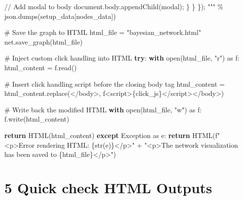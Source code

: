 \documentclass[
  11pt,
  letterpaper,
]{book}
\newenvironment{Shaded}{\begin{snugshade}}{\end{snugshade}}
\newcommand{\BuiltInTok}[1]{\textcolor[rgb]{0.00,0.23,0.31}{#1}}
\newcommand{\CommentTok}[1]{\textcolor[rgb]{0.37,0.37,0.37}{#1}}
\newcommand{\ControlFlowTok}[1]{\textcolor[rgb]{0.00,0.23,0.31}{\textbf{#1}}}
\newcommand{\ImportTok}[1]{\textcolor[rgb]{0.00,0.46,0.62}{#1}}
\newcommand{\NormalTok}[1]{\textcolor[rgb]{0.00,0.23,0.31}{#1}}
\newcommand{\OperatorTok}[1]{\textcolor[rgb]{0.37,0.37,0.37}{#1}}
\newcommand{\PreprocessorTok}[1]{\textcolor[rgb]{0.68,0.00,0.00}{#1}}
\newcommand{\SpecialCharTok}[1]{\textcolor[rgb]{0.37,0.37,0.37}{#1}}
\newcommand{\SpecialStringTok}[1]{\textcolor[rgb]{0.13,0.47,0.30}{#1}}
\newcommand{\StringTok}[1]{\textcolor[rgb]{0.13,0.47,0.30}{#1}}
\begin{document}
\begin{Shaded}
\begin{Highlighting}[]
\StringTok{                // Add modal to body}
\StringTok{                document.body.appendChild(modal);}
\StringTok{            \}}
\StringTok{        \}}
\StringTok{    \});}
\StringTok{    """} \OperatorTok{\%}\NormalTok{ json.dumps(setup\_data[}\StringTok{\textquotesingle{}nodes\_data\textquotesingle{}}\NormalTok{])}

    \CommentTok{\# Save the graph to HTML}
\NormalTok{    html\_file }\OperatorTok{=} \StringTok{"bayesian\_network.html"}
\NormalTok{    net.save\_graph(html\_file)}

    \CommentTok{\# Inject custom click handling into HTML}
    \ControlFlowTok{try}\NormalTok{:}
        \ControlFlowTok{with} \BuiltInTok{open}\NormalTok{(html\_file, }\StringTok{"r"}\NormalTok{) }\ImportTok{as}\NormalTok{ f:}
\NormalTok{            html\_content }\OperatorTok{=}\NormalTok{ f.read()}

        \CommentTok{\# Insert click handling script before the closing body tag}
\NormalTok{        html\_content }\OperatorTok{=}\NormalTok{ html\_content.replace(}\StringTok{\textquotesingle{}\textless{}/body\textgreater{}\textquotesingle{}}\NormalTok{, }\SpecialStringTok{f\textquotesingle{}\textless{}script\textgreater{}}\SpecialCharTok{\{}\NormalTok{click\_js}\SpecialCharTok{\}}\SpecialStringTok{\textless{}/script\textgreater{}\textless{}/body\textgreater{}\textquotesingle{}}\NormalTok{)}

        \CommentTok{\# Write back the modified HTML}
        \ControlFlowTok{with} \BuiltInTok{open}\NormalTok{(html\_file, }\StringTok{"w"}\NormalTok{) }\ImportTok{as}\NormalTok{ f:}
\NormalTok{            f.write(html\_content)}

        \ControlFlowTok{return}\NormalTok{ HTML(html\_content)}
    \ControlFlowTok{except} \PreprocessorTok{Exception} \ImportTok{as}\NormalTok{ e:}
        \ControlFlowTok{return}\NormalTok{ HTML(}\SpecialStringTok{f"\textless{}p\textgreater{}Error rendering HTML: }\SpecialCharTok{\{}\BuiltInTok{str}\NormalTok{(e)}\SpecialCharTok{\}}\SpecialStringTok{\textless{}/p\textgreater{}"}
        \OperatorTok{+} \StringTok{"\textless{}p\textgreater{}The network visualization has been saved to \textquotesingle{}}\SpecialCharTok{\{html\_file\}}\StringTok{\textquotesingle{}\textless{}/p\textgreater{}"}\NormalTok{)}
\end{Highlighting}
\end{Shaded}

\chapter{5 Quick check HTML Outputs}\label{quick-check-html-outputs}
\end{document}
